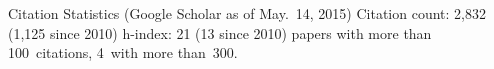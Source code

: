 %
%
\begin{rubric}{Citation Statistics (Google Scholar as of May.~14, 2015)}%
\entry* Citation count: 2,832 (1,125 since 2010)
\entry* h-index: 21 (13 since 2010)
 papers with more than 100~citations, 4~with more than~300.
\end{rubric}
